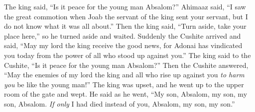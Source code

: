 \begin{biblechapter}
\verse The king said, “Is it peace for the young man Absalom?” Ahimaaz said, “I saw the great commotion when Joab the servant of the king sent your servant, but I do not know what it was all about.”
\verse Then the king said, “Turn aside, take your place here,” so he turned aside and waited.
\verse Suddenly the Cushite arrived and said, “May my lord the king receive the good news, for Adonai has vindicated you today from the power of all who stood up against you.”
\verse The king said to the Cushite, “Is it peace for the young man Absalom?” Then the Cushite answered, “May the enemies of my lord the king and all who rise up against you \textit{to harm you} be like the young man!”
\verse  The king was upset, and he went up to the upper room of the gate and wept. He said as he went, “My son, Absalom, my son, my son, Absalom. \textit{If only} I had died instead of you, Absalom, my son, my son.”
\end{biblechapter}

